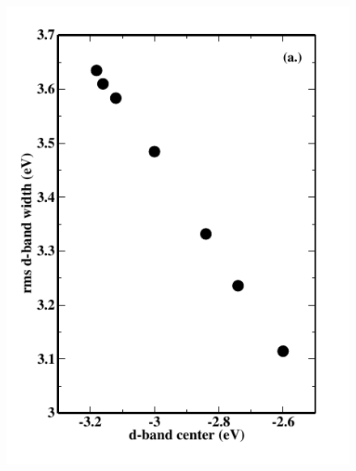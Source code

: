 \documentclass[aps,preprint,superscriptaddress,endfloats*]{revtex4}
\begin{document}
\begin{figure}
\subfigure%
{
\label{fig2a}
\includegraphics{figures/figure2a}
}
\hspace{0cm}

\end{figure}
\end{document}
